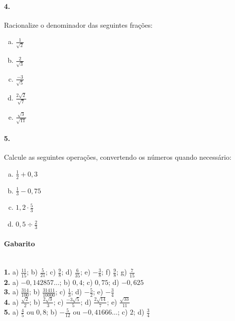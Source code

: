 \documentclass[a4paper,twocolumn,12pt]{article}
\begin{document}
\paragraph*{4. } Racionalize o denominador das seguintes frações:
\begin{enumerate}[a)]
\item $\frac{1}{\sqrt{2}}$
\item $\frac{2}{\sqrt{3}}$
\item $\frac{-3}{\sqrt{5}}$
\item $\frac{2\sqrt{2}}{\sqrt{7}}$
\item $\frac{\sqrt{3}}{\sqrt{11}}$
\end{enumerate}

\paragraph*{5.} Calcule as seguintes operações, convertendo os números quando necessário:
\begin{enumerate}[a)]
\item $\frac{1}{2} + 0,\!3$
\item $\frac{1}{3} - 0,\!75$
\item $1,\!2\cdot\frac{5}{3} $
\item $0,\!5\div\frac{2}{3}$
\end{enumerate}
\vfill

{\footnotesize\color{darkgray}
\paragraph*{Gabarito} \hspace*{\fill}\\ 
\textbf{1.} a) $\frac{11}{15}$; b) $\frac{5}{21}$; c) $\frac{9}{8}$; d) $\frac{6}{35}$; e) $-\frac{3}{8}$; f) $\frac{9}{8}$; g) $\frac{7}{15}$\\
\textbf{2.} a) $-0,142857...$; b) $0,4$; c) $0,75$; d) $-0,625$\\
\textbf{3.} a) $\frac{314}{100}$; b) $\frac{31411}{10000}$; c) $\frac{1}{3}$; d) $-\frac{5}{2}$; e) $-\frac{3}{4}$\\
\textbf{4.} a) $\frac{\sqrt{2}}{2}$; b) $\frac{2\sqrt{3}}{3}$; c) $\frac{-3\sqrt{5}}{5}$; d) $\frac{2\sqrt{14}}{7}$; e) $\frac{\sqrt{33}}{11}$\\
\textbf{5.} a) $\frac{4}{5}$ ou $0,\!8$; b) $-\frac{5}{12}$ ou $-0,41666\ldots$; c) $2$; d) $\frac{3}{4}$
}
\end{document}
